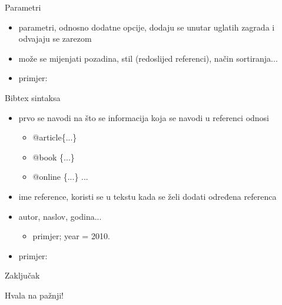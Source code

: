 \documentclass{beamer}
\begin{document}
\begin{frame}{Parametri}
\begin{itemize}
	\item parametri, odnosno dodatne opcije, dodaju se unutar uglatih zagrada i odvajaju se zarezom \\
	\item može se mijenjati pozadina, stil (redoslijed referenci), način sortiranja... \\
	\item primjer:
\end{itemize}
\end{frame}

\begin{frame}{Bibtex sintaksa}
\begin{itemize}
	\item prvo se navodi na što se informacija koja se navodi u referenci odnosi \\
	\begin{itemize}
		\item @article\{...\} \\
		\item @book \{...\}\\
		\item @online \{...\} ... \\
	\end{itemize}
	\item ime reference, koristi se u tekstu kada se želi dodati određena referenca \\
	\item autor, naslov, godina... 
		\begin{itemize}
			\item primjer; year = 2010.
		\end{itemize}
	\item primjer:
\end{itemize}
\end{frame}

\begin{frame}{Zaključak}
\end{frame}

\begin{frame}
Hvala na pažnji!
\end{frame}
\end{document}
